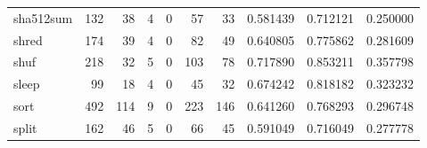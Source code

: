 \begin{longtable}{lrrrrrrrrr}
sha512sum &                                                132 &                                                 38 &                                                  4 &                                                  0 &                                                 57 &                                                 33 &                                           0.581439 &                               0.712121 &                             0.250000 \\
shred     &                                                174 &                                                 39 &                                                  4 &                                                  0 &                                                 82 &                                                 49 &                                           0.640805 &                               0.775862 &                             0.281609 \\
shuf      &                                                218 &                                                 32 &                                                  5 &                                                  0 &                                                103 &                                                 78 &                                           0.717890 &                               0.853211 &                             0.357798 \\
sleep     &                                                 99 &                                                 18 &                                                  4 &                                                  0 &                                                 45 &                                                 32 &                                           0.674242 &                               0.818182 &                             0.323232 \\
sort      &                                                492 &                                                114 &                                                  9 &                                                  0 &                                                223 &                                                146 &                                           0.641260 &                               0.768293 &                             0.296748 \\
split     &                                                162 &                                                 46 &                                                  5 &                                                  0 &                                                 66 &                                                 45 &                                           0.591049 &                               0.716049 &                             0.277778 \\

\end{longtable}
